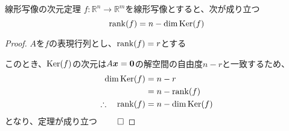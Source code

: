 \documentclass[../../../topic_linear-algebra]{subfiles}
\begin{document}
\begin{theorem}{線形写像の次元定理}\label{thm:rank-nullity-theorem}
  $f\colon \mathbb{R}^n \to \mathbb{R}^m$を線形写像とすると、次が成り立つ
  \begin{equation*}
    \rank(f) = n - \dim \operatorname{Ker}(f)
  \end{equation*}
\end{theorem}

\begin{proof}
  $A$を$f$の表現行列とし、$\rank(f) = r$とする

  このとき、$\operatorname{Ker}(f)$の次元は$A\vb*{x} = \vb*{0}$の解空間の自由度$n - r$と一致するため、
  \begin{align*}
    \dim \operatorname{Ker}(f)              & = n - r            \\
                              & = n - \rank(f)     \\
    \therefore \quad \rank(f) & = n - \dim \operatorname{Ker}(f)
  \end{align*}
  となり、定理が成り立つ $\qed$
\end{proof}
\end{document}
